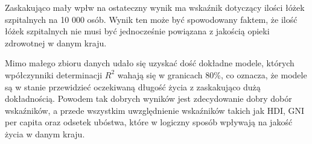 \documentclass{article}
\begin{document}
Zaskakująco mały wpłw na ostateczny wynik ma wskaźnik dotyczący ilości łóżek szpitalnych na 10 000 osób. 
Wynik ten może być spowodowany faktem, że ilość łóżek szpitalnych nie musi być jednocześnie powiązana
z jakością opieki zdrowotnej w danym kraju.

Mimo małego zbioru danych udało się uzyskać dość dokładne modele, których
wpółczynniki determinacji $R^{2}$ wahają się w granicach 80\%, co oznacza, że modele są w stanie przewidzieć
oczekiwaną długość życia z zaskakująco dużą dokładnością. Powodem tak dobrych wyników jest zdecydowanie
dobry dobór wskaźników, a przede wszystkim uwzględnienie wskaźników takich jak HDI, GNI per capita oraz odsetek ubóstwa,
które w logiczny sposób wpływają na jakość życia w danym kraju.
\end{document}
